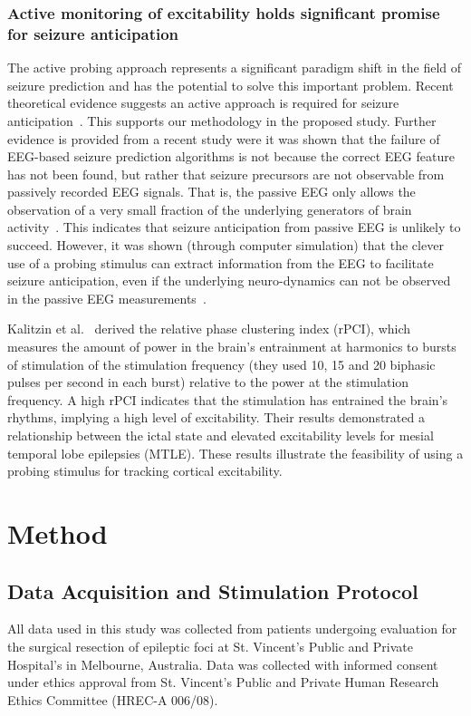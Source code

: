 \documentclass[]{article}
\begin{document}
\subsubsection{Active monitoring of excitability holds significant promise for seizure anticipation}
The active probing approach represents a significant paradigm shift in the field of seizure prediction and has the potential to solve this important problem. Recent theoretical evidence suggests an active approach is required for seizure anticipation~\cite{Suffczynski2008}. This supports our methodology in the proposed study. Further evidence is provided from a recent study were it was shown that the failure of EEG-based seizure prediction algorithms is not because the correct EEG feature has not been found, but rather that seizure precursors are not observable from passively recorded EEG signals. That is, the passive EEG only allows the observation of a very small fraction of the underlying generators of brain activity~\cite{O'Sullivan-Greene2009, O'Sullivan-Greene2009a}. This indicates that seizure anticipation from passive EEG is unlikely to succeed. However, it was shown (through computer simulation) that the clever use of a probing stimulus can extract information from the EEG to facilitate seizure anticipation, even if the underlying neuro-dynamics can not be observed in the passive EEG measurements~\cite{O'Sullivan-Greene2009a}. 

Kalitzin et al.~\cite{Kalitzin2005} derived the relative phase clustering index (rPCI), which measures the amount of power in the brain’s entrainment at harmonics to bursts of stimulation  of the stimulation frequency (they used 10, 15 and 20 biphasic pulses per second in each burst) relative to the power at the stimulation frequency. A high rPCI indicates that the stimulation has entrained the brain’s rhythms, implying a high level of excitability. Their results demonstrated a relationship between the ictal state and elevated excitability levels for mesial temporal lobe epilepsies (MTLE). These results illustrate the feasibility of using a probing stimulus for tracking cortical excitability.

\section{Method}
\subsection{Data Acquisition and Stimulation Protocol}
All data used in this study was collected from patients undergoing evaluation for the surgical resection of epileptic foci at St. Vincent's Public and Private Hospital's in Melbourne, Australia. Data was collected with informed consent under ethics approval from St. Vincent's Public and Private Human Research Ethics Committee (HREC-A 006/08).
\end{document}
